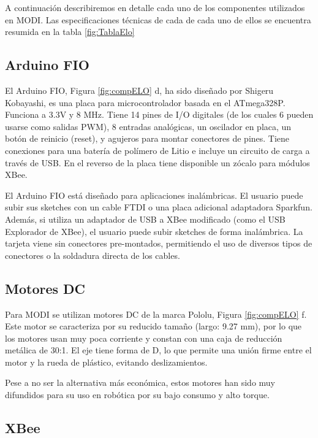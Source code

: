 A continuación describiremos en detalle cada uno de los componentes utilizados en MODI. Las especificaciones técnicas de cada de cada uno de ellos se encuentra resumida en la tabla \ref{fig:TablaElo}

\subsection{Arduino FIO}
El Arduino FIO, Figura \ref{fig:compELO} d, ha sido diseñado por Shigeru Kobayashi, es una placa para microcontrolador basada en el ATmega328P. Funciona a 3.3V y 8 MHz. Tiene 14 pines de I/O digitales (de los cuales 6 pueden usarse como salidas PWM), 8 entradas analógicas, un oscilador en placa, un botón de reinicio (reset), y agujeros para montar conectores de pines. Tiene conexiones para una batería de polímero de Litio e incluye un circuito de carga a través de USB. En el reverso de la placa tiene disponible un zócalo para módulos XBee.

El Arduino FIO está diseñado para aplicaciones inalámbricas. El usuario puede subir sus sketches con un cable FTDI o una placa adicional adaptadora Sparkfun. Además, si utiliza un adaptador de USB a XBee modificado (como el USB Explorador de XBee), el usuario puede subir sketches de forma inalámbrica. La tarjeta viene sin conectores pre-montados, permitiendo el uso de diversos tipos de conectores o la soldadura directa de los cables. 

\subsection{Motores DC}
Para MODI se utilizan motores DC de la marca Pololu, Figura \ref{fig:compELO} f. Este motor se caracteriza por su reducido tamaño (largo: 9.27 mm), por lo que los motores usan muy poca corriente y constan con una caja de reducción metálica de 30:1. El eje tiene forma de D, lo que permite una unión firme entre el motor y la rueda de plástico, evitando deslizamientos.

Pese a no ser la alternativa más económica, estos motores han sido muy difundidos para su uso en robótica por su bajo consumo y alto torque. 
\subsection{XBee}

